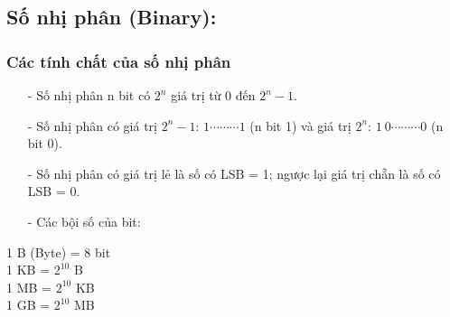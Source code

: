 \subsection{Số nhị phân (Binary):}
\subsubsection{Các tính chất của số nhị phân}
\begin{itemize}
    \item[-] Số nhị phân n bit có $2^n$ giá trị từ $0$ đến $2^n-1$.
    \item[-] Số nhị phân có giá trị $2^n-1$: $1\cdots \cdots \cdots 1$ (n bit 1) và giá trị $2^n$: $1 \ 0 \cdots \cdots \cdots 0$ (n bit 0).
    \item[-] Số nhị phân có giá trị lẻ là số có LSB = 1; ngược lại giá trị chẵn là số có LSB = 0.
    \item[-] Các bội số của bit:
\end{itemize}
\begin{center}
    1 B (Byte) = 8 bit \\
    1 KB = $2^{10}$ B \\
    1 MB = $2^{10}$ KB \\
    1 GB = $2^{10}$ MB 
\end{center}
